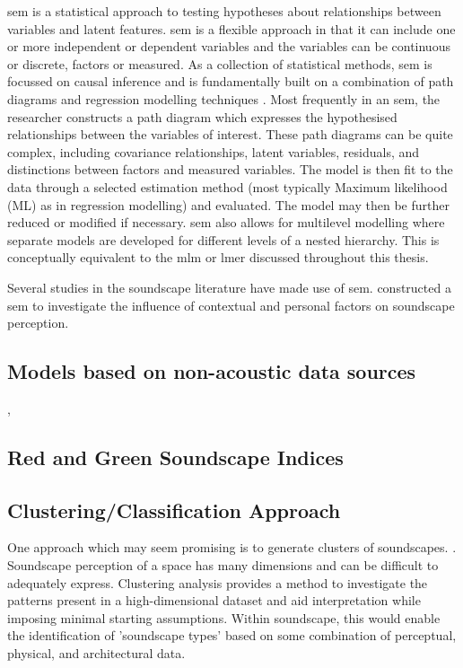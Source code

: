 \gls{sem} is a statistical approach to testing hypotheses about relationships between variables and latent features. \gls{sem} is a flexible approach in that it can include one or more independent or dependent variables and the variables can be continuous or discrete, factors or measured. As a collection of statistical methods, \gls{sem} is focussed on causal inference and is fundamentally built on a combination of path diagrams and regression modelling techniques \citep{Ullman2012Structural}. Most frequently in an \gls{sem}, the researcher constructs a path diagram which expresses the hypothesised relationships between the variables of interest. These path diagrams can be quite complex, including covariance relationships, latent variables, residuals, and distinctions between factors and measured variables. The model is then fit to the data through a selected estimation method (most typically Maximum likelihood (ML) as in regression modelling) and evaluated. The model may then be further reduced or modified if necessary. \gls{sem} also allows for multilevel modelling where separate models are developed for different levels of a nested hierarchy. This is conceptually equivalent to the \gls{mlm} or \gls{lmer} discussed throughout this thesis. 

Several studies in the soundscape literature have made use of \gls{sem}. \citet{Tarlao2020Investigating} constructed a \gls{sem} to investigate the influence of contextual and personal factors on soundscape perception.

\subsection{Models based on non-acoustic data sources}

\citep{Verma2020Predicting}, \citep{Gasco2020Social}

\subsection{Red and Green Soundscape Indices}
\citep{Yang2022Effects,Kogan2018Green} 

\subsection{Clustering/Classification Approach}
One approach which may seem promising is to generate clusters of soundscapes. . Soundscape perception of a space has many dimensions and can be difficult to adequately express. Clustering analysis provides a method to investigate the patterns present in a high-dimensional dataset and aid interpretation while imposing minimal starting assumptions. Within soundscape, this would enable the identification of 'soundscape types' based on some combination of perceptual, physical, and architectural data. 

